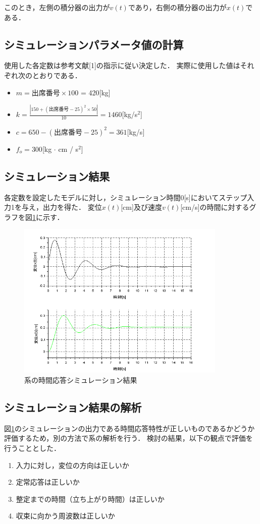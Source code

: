 \documentclass[dvipdfmx,titlepage,a4j]{jsarticle}  %
\begin{document}
このとき，左側の積分器の出力が$v(t)$であり，右側の積分器の出力が$x(t)$である．

\subsection{シミュレーションパラメータ値の計算}
使用した各定数は参考文献[1]の指示に従い決定した．
実際に使用した値はそれぞれ次のとおりである．
\begin{itemize}
  \item $m = 出席番号 \times 100$ = 420[kg]
  \item $k = \frac{|150 + (出席番号 - 25)^2 \times 50|}{10} = 1460$[kg/s$^2$]
  \item $c = 650 - (出席番号 - 25)^2 = 361$[kg/s]
  \item $f_o = 300$[kg $\cdot$ cm / s$^2$]
\end{itemize}

\subsection{シミュレーション結果}
各定数を設定したモデルに対し，シミュレーション時間0[s]においてステップ入力1を与え，出力を得た．
変位$x(t)$[cm]及び速度$v(t)$[cm/s]の時間に対するグラフを図\ref{fig:bane-graph.png}に示す．

\begin{figure}[H]
  \centering
  \includegraphics[width=10cm]{../graph/bane-graph.png}
  \caption{系の時間応答シミュレーション結果}
  \label{fig:bane-graph.png}
\end{figure}

\subsection{シミュレーション結果の解析}
図\ref{fig:bane-graph.png}のシミュレーションの出力である時間応答特性が正しいものであるかどうか評価するため，別の方法で系の解析を行う．
検討の結果，以下の観点で評価を行うこととした．
\begin{enumerate}
  \item 入力に対し，変位の方向は正しいか
  \item 定常応答は正しいか
  \item 整定までの時間（立ち上がり時間）は正しいか
  \item 収束に向かう周波数は正しいか
\end{enumerate}
\end{document}
